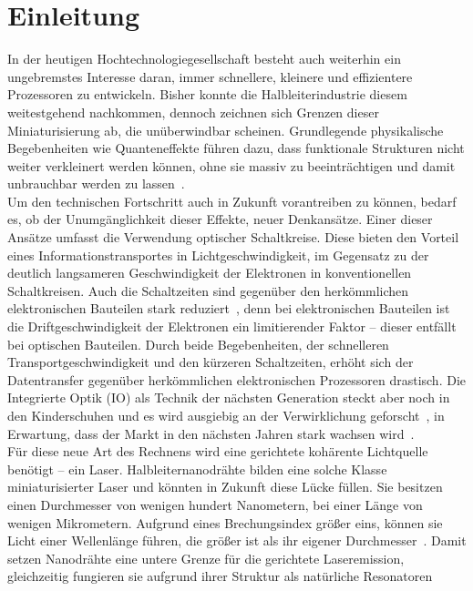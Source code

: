 \chapter{Einleitung} In der heutigen Hochtechnologiegesellschaft besteht auch
weiterhin ein \mbox{ungebremstes} Interesse daran, immer schnellere, kleinere
und effizientere Prozessoren zu \mbox{entwickeln}. Bisher konnte die
Halbleiterindustrie diesem weitestgehend nachkommen, dennoch zeichnen sich
Grenzen dieser Miniaturisierung ab, die unüberwindbar scheinen. Grundlegende
physikalische Begebenheiten wie Quanteneffekte führen dazu, dass funktionale
Strukturen nicht weiter verkleinert werden können, ohne sie massiv zu
beeinträchtigen und damit unbrauchbar werden zu lassen~\cite{Moore.2017}.\\  Um
den technischen Fortschritt auch in Zukunft vorantreiben zu können, bedarf es,
ob der Unumgänglichkeit dieser Effekte, neuer Denkansätze. Einer dieser Ansätze
umfasst die Verwendung optischer Schaltkreise. Diese bieten den Vorteil eines
Informationstransportes in Lichtgeschwindigkeit, im Gegensatz zu der deutlich
langsameren \mbox{Geschwindigkeit} der Elektronen in konventionellen
Schaltkreisen. Auch die Schaltzeiten sind gegenüber den herkömmlichen
elektronischen Bauteilen stark reduziert~\cite{Simonite.2010,Johnson.2015}, denn
bei elektronischen Bauteilen ist die Driftgeschwindigkeit der Elektronen ein
limitierender Faktor – dieser entfällt bei optischen Bauteilen. Durch beide
\mbox{Begebenheiten}, der schnelleren Transportgeschwindigkeit und den kürzeren
Schaltzeiten, \mbox{erhöht} sich der Datentransfer gegenüber herkömmlichen
elektronischen Prozessoren drastisch. Die Integrierte Optik (IO) als Technik der
nächsten Generation steckt aber noch in den Kinderschuhen und es wird ausgiebig
an der Verwirklichung geforscht~\cite{Touch.2017}, in Erwartung, dass der Markt
in den nächsten Jahren stark wachsen wird~\cite{Credence.2017}.\\ Für diese neue
Art des Rechnens wird eine gerichtete kohärente Lichtquelle benötigt – ein
Laser. Halbleiternanodrähte bilden eine solche Klasse miniaturisierter Laser und
könnten in Zukunft diese Lücke füllen. Sie besitzen einen Durchmesser von
wenigen hundert Nanometern, bei einer Länge von wenigen Mikrometern. Aufgrund
eines \mbox{Brechungsindex} größer eins, können sie Licht einer Wellenlänge
führen, die größer ist als ihr eigener Durchmesser~\cite{Zimmler.2010}. Damit
setzen Nanodrähte eine untere Grenze für die gerichtete Laseremission,
gleichzeitig fungieren sie aufgrund ihrer Struktur als natürliche Resonatoren
